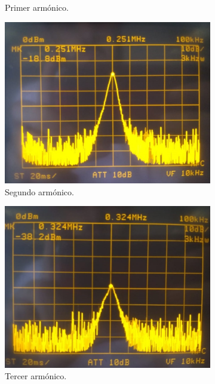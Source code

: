 \begin{figure}[H]
\begin{subfigure}{.425\textwidth}
	\caption{Primer armónico.}
	\label{fig:1er}
\end{subfigure}
\begin{subfigure}{.4\textwidth}
\centering
	\includegraphics[width=\textwidth]{Imagenes-Ej1/2Armonico.jpeg}
	\caption{Segundo armónico.}
	\label{fig:2do}
\end{subfigure}
\begin{subfigure}{.4\textwidth}
\centering
	\includegraphics[width=\textwidth]{Imagenes-Ej1/3Armonico.jpeg}
	\caption{Tercer armónico.}
	\label{fig:3er}
\end{subfigure}
\begin{subfigure}{.4\textwidth}

\end{subfigure}
\end{figure}
